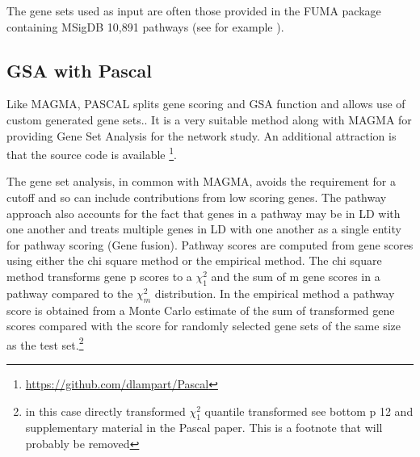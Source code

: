 The gene sets used as input are often those provided in the FUMA package \cite{watanabe2017functional} containing MSigDB\cite{liberzon2015molecular} 10,891 pathways (see for example \cite{dashti2019genome}).
\subsection{GSA with Pascal}
\label{sec:GSA with PASCAL}


Like MAGMA, PASCAL splits gene scoring and GSA function and allows use of custom generated gene sets.\cite{lamparter2016fast}. It is a very suitable method along with MAGMA for providing Gene Set Analysis for the network study. An additional attraction is that the source code is available \footnote{\url{https://github.com/dlampart/Pascal}}.

The gene set analysis, in common with MAGMA, avoids the requirement for a cutoff and so can include contributions from low scoring genes.
The pathway approach also accounts for the fact that genes in a pathway may be in LD with one another and treats multiple genes in LD with one another as a single entity for pathway scoring (Gene fusion). 
Pathway scores are computed from gene scores using either the  chi square method or the empirical method. The chi square method transforms gene p scores to a $\chi_1^2$ and the sum of m gene scores in a pathway compared to the $\chi_m^2$ distribution. In the empirical method a pathway score is obtained from a Monte Carlo estimate of the sum of transformed gene scores compared with the score for randomly selected gene sets of the same size as the test set.\footnote{in this case directly transformed $\chi_1^2$ quantile transformed see bottom p 12 and supplementary material in the Pascal paper. This is a footnote that will probably be removed} 

